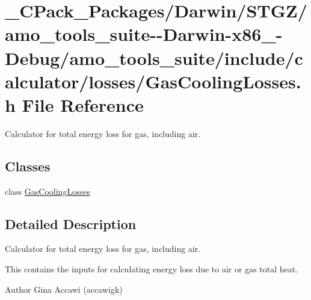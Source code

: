 \hypertarget{___c_pack___packages_2_darwin_2_s_t_g_z_2amo__tools__suite--_darwin-x86__64-_debug_2amo__tools__5932f41982c582eb9a7216534ce16f51}{}\section{\+\_\+\+C\+Pack\+\_\+\+Packages/\+Darwin/\+S\+T\+G\+Z/amo\+\_\+tools\+\_\+suite-\/-\/\+Darwin-\/x86\+\_-\/\+Debug/amo\+\_\+tools\+\_\+suite/include/calculator/losses/\+Gas\+Cooling\+Losses.h File Reference}
\label{___c_pack___packages_2_darwin_2_s_t_g_z_2amo__tools__suite--_darwin-x86__64-_debug_2amo__tools__5932f41982c582eb9a7216534ce16f51}


Calculator for total energy loss for gas, including air.  


\subsection*{Classes}
\begin{DoxyCompactItemize}
\item 
class \hyperlink{class_gas_cooling_losses}{Gas\+Cooling\+Losses}
\end{DoxyCompactItemize}


\subsection{Detailed Description}
Calculator for total energy loss for gas, including air. 

This contains the inputs for calculating energy loss due to air or gas total heat.

\begin{DoxyAuthor}{Author}
Gina Accawi (accawigk) 
\end{DoxyAuthor}
